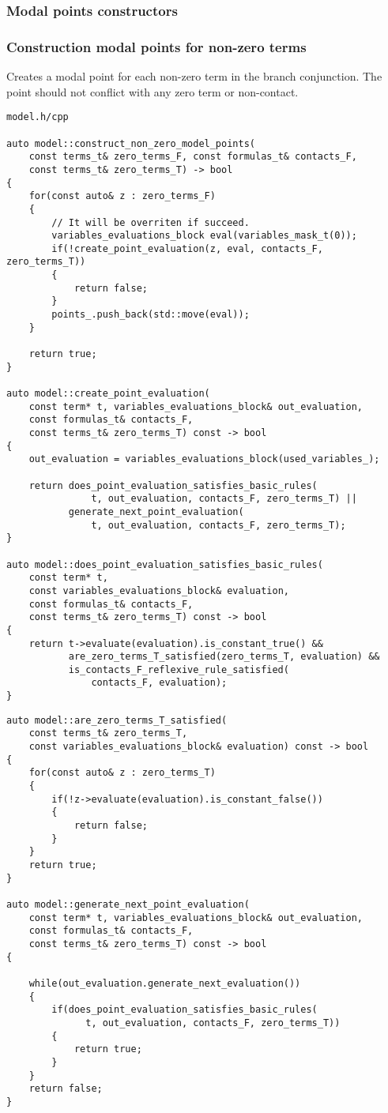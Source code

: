 \documentclass{article}
\begin{document}
	\subsubsection*{Modal points constructors}
	\subsubsection*{Construction modal points for non-zero terms}
	Creates a modal point for each non-zero term in the branch conjunction. The point should not conflict with any zero term or non-contact.
\\
\begin{lstlisting}
model.h/cpp

auto model::construct_non_zero_model_points(
	const terms_t& zero_terms_F, const formulas_t& contacts_F,
	const terms_t& zero_terms_T) -> bool
{
    for(const auto& z : zero_terms_F)
    {
        // It will be overriten if succeed.
        variables_evaluations_block eval(variables_mask_t(0));
        if(!create_point_evaluation(z, eval, contacts_F, zero_terms_T))
        {
            return false;
        }
        points_.push_back(std::move(eval));
    }

    return true;
}

auto model::create_point_evaluation(
	const term* t, variables_evaluations_block& out_evaluation,
	const formulas_t& contacts_F,
	const terms_t& zero_terms_T) const -> bool
{
    out_evaluation = variables_evaluations_block(used_variables_);

    return does_point_evaluation_satisfies_basic_rules(
               t, out_evaluation, contacts_F, zero_terms_T) ||
           generate_next_point_evaluation(
               t, out_evaluation, contacts_F, zero_terms_T);
}

auto model::does_point_evaluation_satisfies_basic_rules(
	const term* t,
	const variables_evaluations_block& evaluation,
	const formulas_t& contacts_F,
	const terms_t& zero_terms_T) const -> bool
{
    return t->evaluate(evaluation).is_constant_true() &&
           are_zero_terms_T_satisfied(zero_terms_T, evaluation) &&
           is_contacts_F_reflexive_rule_satisfied(
               contacts_F, evaluation);
}
\end{lstlisting}
\newpage
\begin{lstlisting}
auto model::are_zero_terms_T_satisfied(
	const terms_t& zero_terms_T,
	const variables_evaluations_block& evaluation) const -> bool
{
    for(const auto& z : zero_terms_T)
    {
        if(!z->evaluate(evaluation).is_constant_false())
        {
            return false;
        }
    }
    return true;
}

auto model::generate_next_point_evaluation(
	const term* t, variables_evaluations_block& out_evaluation,
	const formulas_t& contacts_F,
	const terms_t& zero_terms_T) const -> bool
{

    while(out_evaluation.generate_next_evaluation())
    {
        if(does_point_evaluation_satisfies_basic_rules(
              t, out_evaluation, contacts_F, zero_terms_T))
        {
            return true;
        }
    }
    return false;
}
\end{lstlisting}
\end{document}
